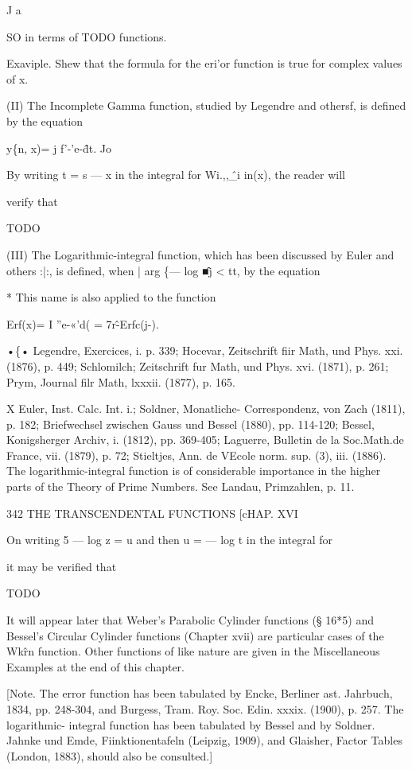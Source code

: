 J a

SO in terms of TODO functions.

Exaviple. Shew that the formula for the eri'or function is true for
complex values of x.

(II) The Incomplete Gamma function, studied by Legendre and othersf,
is defined by the equation

y\{n, x)= j f'-'e-\^dt. Jo

By writing t = s — x in the integral for Wi.,,\^\_i in(x), the reader
will

verify that

TODO

(III) The Logarithmic-integral function, which has been discussed by
Euler and others :|:, is defined, when | arg \{— log \^■j < tt, by the
equation

* This name is also applied to the function

Erf(x)= I ''e-«'d( = 7r\^-Erfc(j-).

•\{• Legendre, Exercices, i. p. 339; Hocevar, Zeitschrift fiir Math,
und Phys. xxi. (1876), p. 449; Schlomilch; Zeitschrift fur Math, und
Phys. xvi. (1871), p. 261; Prym, Journal filr Math, lxxxii. (1877),
p. 165.

X Euler, Inst. Calc. Int. i.; Soldner, Monatliche- Correspondenz, von
Zach (1811), p. 182; Briefwechsel zwischen Gauss und Bessel (1880),
pp. 114-120; Bessel, Konigsherger Archiv, i. (1812), pp. 369-405;
Laguerre, Bulletin de la Soc.Math.de France, vii. (1879), p. 72;
Stieltjes, Ann. de VEcole norm. sup. (3), iii. (1886). The
logarithmic-integral function is of considerable importance in the
higher parts of the Theory of Prime Numbers. See Landau, Primzahlen,
p. 11.

342 THE TRANSCENDENTAL FUNCTIONS [cHAP. XVI

On writing 5 — log z = u and then u = — log t in the integral for

it may be verified that

TODO

It will appear later that Weber's Parabolic Cylinder functions (§
16*5) and Bessel's Circular Cylinder functions (Chapter xvii) are
particular cases of the Wk\^rn function. Other functions of like
nature are given in the Miscellaneous Examples at the end of this
chapter.

[Note. The error function has been tabulated by Encke, Berliner ast.
Jahrbuch, 1834, pp. 248-304, and Burgess, Tram. Roy. Soc. Edin. xxxix.
(1900), p. 257. The logarithmic- integral function has been tabulated
by Bessel and by Soldner. Jahnke und Emde, Fiinktionentafeln (Leipzig,
1909), and Glaisher, Factor Tables (London, 1883), should also be
consulted.]

